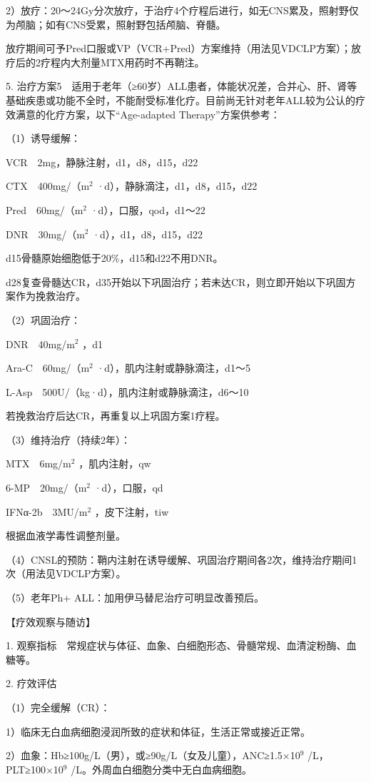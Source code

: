 2）放疗：20～24Gy分次放疗，于治疗4个疗程后进行，如无CNS累及，照射野仅为颅脑；如有CNS受累，照射野包括颅脑、脊髓。

放疗期间可予Pred口服或VP（VCR+Pred）方案维持（用法见VDCLP方案）；放疗后的2疗程内大剂量MTX用药时不再鞘注。

5.
治疗方案5　适用于老年（≥60岁）ALL患者，体能状况差，合并心、肝、肾等基础疾患或功能不全时，不能耐受标准化疗。目前尚无针对老年ALL较为公认的疗效满意的化疗方案，以下“Age-adapted
Therapy”方案供参考：

（1）诱导缓解：

VCR　2mg，静脉注射，d1，d8，d15，d22

CTX　400mg/（m$^2$ ·d），静脉滴注，d1，d8，d15，d22

Pred　60mg/（m$^2$ ·d），口服，qod，d1～22

DNR　30mg/（m$^2$ ·d），d1，d8，d15，d22

d15骨髓原始细胞低于20\%，d15和d22不用DNR。

d28复查骨髓达CR，d35开始以下巩固治疗；若未达CR，则立即开始以下巩固方案作为挽救治疗。

（2）巩固治疗：

DNR　40mg/m$^2$ ，d1

Ara-C　60mg/（m$^2$ ·d），肌内注射或静脉滴注，d1～5

L-Asp　500U/（kg·d），肌内注射或静脉滴注，d6～10

若挽救治疗后达CR，再重复以上巩固方案1疗程。

（3）维持治疗（持续2年）：

MTX　6mg/m$^2$ ，肌内注射，qw

6-MP　20mg/（m$^2$ ·d），口服，qd

IFNα-2b　3MU/m$^2$ ，皮下注射，tiw

根据血液学毒性调整剂量。

（4）CNSL的预防：鞘内注射在诱导缓解、巩固治疗期间各2次，维持治疗期间1次（用法见VDCLP方案）。

（5）老年Ph{+} ALL：加用伊马替尼治疗可明显改善预后。

【疗效观察与随访】

1.
观察指标　常规症状与体征、血象、白细胞形态、骨髓常规、血清淀粉酶、血糖等。

2. 疗效评估

（1）完全缓解（CR）：

1）临床无白血病细胞浸润所致的症状和体征，生活正常或接近正常。

2）血象：Hb≥100g/L（男），或≥90g/L（女及儿童），ANC≥1.5×10$^{9}$
/L，PLT≥100×10$^{9}$ /L。外周血白细胞分类中无白血病细胞。

